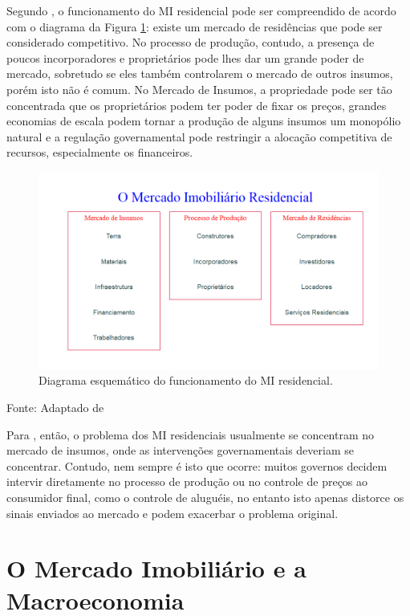 \documentclass[
	12pt,				%
	oneside,			%
	a4paper,			%
	chapter=TITLE,		%
	section=TITLE,		%
	english,			%
	brazil				%
	]{abntex2}
\newcommand{\bcenter}{\begin{center}}
\newcommand{\ecenter}{\end{center}}
\begin{document}
Segundo \textcite[p.~188-189]{shelter}, o funcionamento do \gls{MI} residencial pode
ser compreendido de acordo com o diagrama da Figura \ref{fig:MIResidencial}:
existe um mercado de residências que pode ser considerado competitivo. No
processo de produção, contudo, a presença de poucos incorporadores e
proprietários pode lhes dar um grande poder de mercado, sobretudo se eles também
controlarem o mercado de outros insumos, porém isto não é comum. No Mercado de
Insumos, a propriedade pode ser tão concentrada que os proprietários podem ter
poder de fixar os preços, grandes economias de escala podem tornar a produção de
alguns insumos um monopólio natural e a regulação governamental pode restringir
a alocação competitiva de recursos, especialmente os financeiros.
\begin{figure}[H]

{\centering \includegraphics[width=0.7\linewidth]{images/MIResidencial-1} 

}

\caption{Diagrama esquemático do funcionamento do \gls{MI} residencial.}\label{fig:MIResidencial}
\end{figure}
\bcenter

Fonte: Adaptado de \textcite[p.~189]{shelter}
\ecenter

Para \textcite[p.~189]{shelter}, então, o problema dos \gls{MI} residenciais usualmente
se concentram no mercado de insumos, onde as intervenções governamentais
deveriam se concentrar. Contudo, nem sempre é isto que ocorre: muitos governos
decidem intervir diretamente no processo de produção ou no controle de preços ao
consumidor final, como o controle de aluguéis, no entanto isto apenas distorce
os sinais enviados ao mercado e podem exacerbar o problema original.

\hypertarget{macro}{%
\section{O Mercado Imobiliário e a Macroeconomia}\label{macro}}
\end{document}
